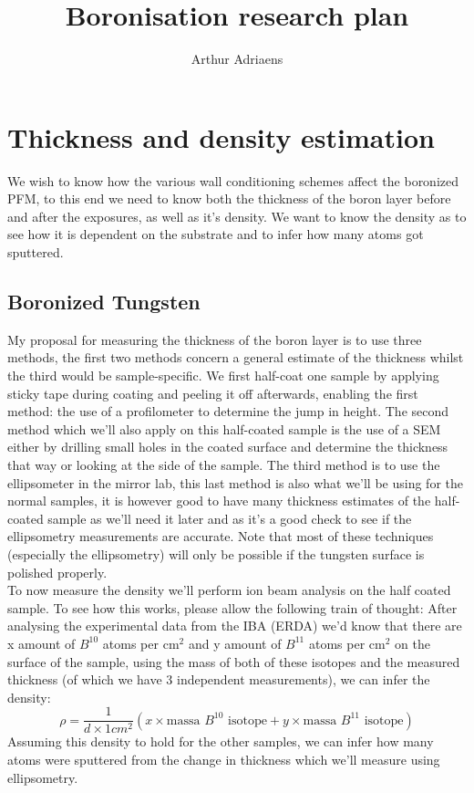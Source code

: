 \documentclass{article}
\title{Boronisation research plan}
\author{Arthur Adriaens}
\begin{document}
\maketitle

\section{Thickness and density estimation}
We wish to know how the various wall conditioning schemes affect the boronized PFM, to
this end we need to know both the thickness of the boron layer before and after the
exposures, as well as it's density.  We want to know the density as to see how
it is dependent on the substrate and to infer how many atoms got sputtered.
\subsection{Boronized Tungsten}
My proposal for measuring the thickness
of the boron layer is to use three methods, the first two methods concern a
general estimate of the thickness whilst the third would be sample-specific.
We first half-coat one sample by applying sticky tape during coating and
peeling it off afterwards, enabling the first method: the use of a profilometer
to determine the jump in height. The second method which we'll also apply on
this half-coated sample is the use of a SEM either by drilling small holes in
the coated surface and determine the thickness that way or looking at the side
of the sample.  The third method is to use the ellipsometer in the mirror lab,
this last method is also what we'll be using for the normal samples, it is
however good to have many thickness estimates of the half-coated sample as
we'll need it later and as it's a good check to see if the ellipsometry
measurements are accurate.  Note that most of these techniques (especially the
ellipsometry) will only be possible if the tungsten surface is polished properly.
 \vspace{0.2cm} \\
To now measure the density we'll perform ion beam analysis on the half coated
sample. To see how this works, please allow the following train of thought: After
analysing the experimental data from the IBA (ERDA) we'd know that there are x amount
of $B^{10}$ atoms per cm$^2$ and y amount of $B^{11}$ atoms per cm$^2$ on the
surface of the sample, using the mass of both of these isotopes and the
measured thickness (of which we have 3 independent measurements), we can infer
the density:
\begin{equation}
    \rho = \frac{1}{d \times 1 cm^2} \left( x \times \text{massa }B^{10}   \text{ isotope} + y \times \text{massa }B^{11}   \text{ isotope}\right)
\end{equation}
Assuming this density to hold for the other samples, we can infer how many atoms 
were sputtered from the change in thickness which we'll measure using ellipsometry.
\end{document}
